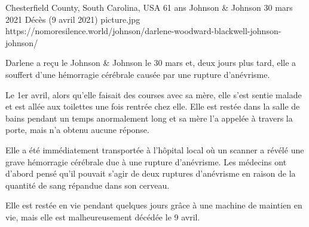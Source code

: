 {Chesterfield County, South Carolina, USA}
{61 ans}
{Johnson \& Johnson}
{30 mars 2021}
{Décès (9 avril 2021)}
{picture.jpg}
{https://nomoresilence.world/johnson/darlene-woodward-blackwell-johnson-johnson/}
{

Darlene a reçu le Johnson \& Johnson le 30 mars et, deux jours plus tard, elle a
souffert d'une hémorragie cérébrale causée par une rupture d'anévrisme.

Le 1er avril, alors qu'elle faisait des courses avec sa mère, elle s'est sentie
malade et est allée aux toilettes une fois rentrée chez elle. Elle est restée
dans la salle de bains pendant un temps anormalement long et sa mère l'a appelée
à travers la porte, mais n'a obtenu aucune réponse.

Elle a été immédiatement transportée à l'hôpital local où un scanner a révélé
une grave hémorragie cérébrale due à une rupture d'anévrisme. Les médecins ont
d'abord pensé qu'il pouvait s'agir de deux ruptures d'anévrisme en raison de la
quantité de sang répandue dans son cerveau.

Elle est restée en vie pendant quelques jours grâce à une machine de maintien en
vie, mais elle est malheureusement décédée le 9 avril.

}
